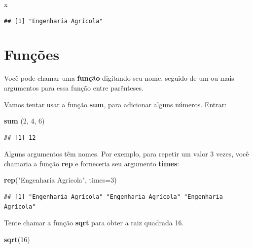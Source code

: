 \documentclass[]{book}
\newenvironment{Shaded}{\begin{snugshade}}{\end{snugshade}}
\newcommand{\DataTypeTok}[1]{\textcolor[rgb]{0.13,0.29,0.53}{#1}}
\newcommand{\DecValTok}[1]{\textcolor[rgb]{0.00,0.00,0.81}{#1}}
\newcommand{\KeywordTok}[1]{\textcolor[rgb]{0.13,0.29,0.53}{\textbf{#1}}}
\newcommand{\NormalTok}[1]{#1}
\newcommand{\StringTok}[1]{\textcolor[rgb]{0.31,0.60,0.02}{#1}}
\begin{document}
\begin{Shaded}
\begin{Highlighting}[]
\NormalTok{x}
\end{Highlighting}
\end{Shaded}

\begin{verbatim}
## [1] "Engenharia Agrícola"
\end{verbatim}

\hypertarget{funcoes}{%
\section{Funções}\label{funcoes}}

Você pode chamar uma \textbf{função} digitando seu nome, seguido de um ou mais argumentos para essa função entre parênteses.

Vamos tentar usar a função \textbf{sum}, para adicionar alguns números. Entrar:

\begin{Shaded}
\begin{Highlighting}[]
\KeywordTok{sum}\NormalTok{ (}\DecValTok{2}\NormalTok{, }\DecValTok{4}\NormalTok{, }\DecValTok{6}\NormalTok{)}
\end{Highlighting}
\end{Shaded}

\begin{verbatim}
## [1] 12
\end{verbatim}

Alguns argumentos têm nomes. Por exemplo, para repetir um valor 3 vezes, você chamaria a função \textbf{rep} e forneceria seu argumento \textbf{times}:

\begin{Shaded}
\begin{Highlighting}[]
\KeywordTok{rep}\NormalTok{(}\StringTok{"Engenharia Agrícola"}\NormalTok{, }\DataTypeTok{times=}\DecValTok{3}\NormalTok{)}
\end{Highlighting}
\end{Shaded}

\begin{verbatim}
## [1] "Engenharia Agrícola" "Engenharia Agrícola" "Engenharia Agrícola"
\end{verbatim}

Tente chamar a função \textbf{sqrt} para obter a raiz quadrada 16.

\begin{Shaded}
\begin{Highlighting}[]
\KeywordTok{sqrt}\NormalTok{(}\DecValTok{16}\NormalTok{)}
\end{Highlighting}
\end{Shaded}
\end{document}
